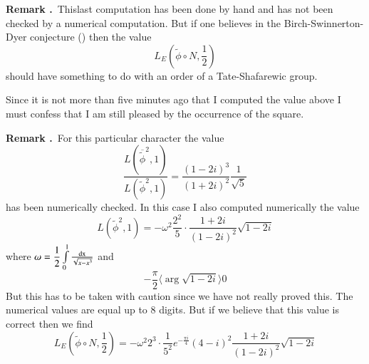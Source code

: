 \medskip
\noindent
{\bf Remark .\label{art2-rem1}}~This\pageoriginale last computation has been done by hand and has not been checked by a numerical computation. But if one believes in the Birch-Swinnerton-Dyer conjecture (\cite{art2-key26}) then the value
$$
L_{E}\left(\widetilde{\phi}\circ N,\frac{1}{2}\right)
$$
should have something to do with an order of a Tate-Shafarewic group.

Since it is not more than five minutes ago that I computed the value above I must confess that I am still pleased by the occurrence of the square.

\medskip
\noindent
{\bf Remark .\label{art2-rem2}}~For this particular character the value
$$
\frac{L(\overline{\widetilde{\phi}}^{2},1)}{L(\widetilde{\phi}^{2},1)}=\frac{(1-2i)^{3}}{(1+2i)^{2}}\frac{1}{\sqrt{5}}
$$
has been numerically checked. In this case I also computed numerically the value
$$
L(\widetilde{\phi}^{2},1)=-\omega^{2}\frac{2^{2}}{5}\cdot \frac{1+2i}{(1-2i)^{2}}\sqrt{1-2i}
$$
where $\omega=\dfrac{1}{2}\int\limits^{1}_{0}\frac{\mathrm{dx}}{\sqrt{x-x^{3}}}$ and
$$
-\frac{\pi}{2}\langle \arg \sqrt{1-2i}\rangle 0
$$
But this has to be taken with caution since we have not really proved this. The numerical values are equal up to 8 digits. But if we believe that this value is correct then we find
$$
L_{E}\left(\widetilde{\phi}\circ N,\frac{1}{2}\right)=-\omega^{2}2^{3}\cdot \frac{1}{5^{2}}e^{-\frac{\pi i}{4}}(4-i)^{2}\frac{1+2i}{(1-2i)^{2}}\sqrt{1-2i}
$$

